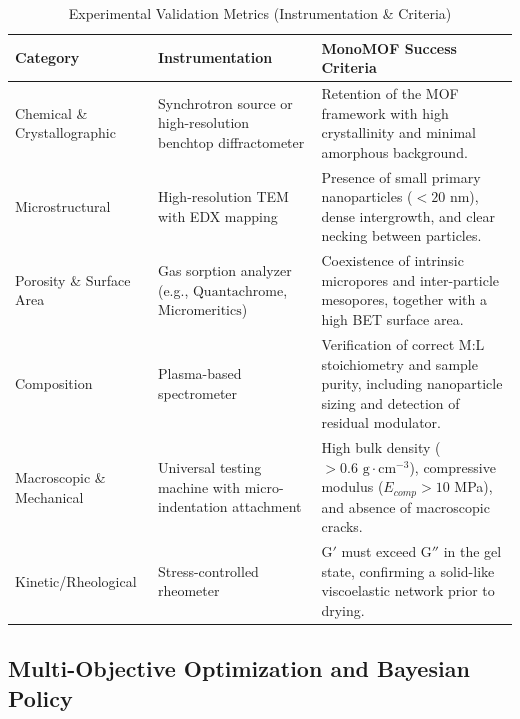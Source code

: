 \documentclass[12pt,a4paper]{article}
\begin{document}
\begin{table}[htbp]
  \centering
  \caption{Experimental Validation Metrics (Instrumentation \& Criteria)}
  \label{tab:table2-2}
  \begin{tabular}{p{3cm} p{4.2cm} p{8cm}}
    \toprule
    \textbf{Category} & \textbf{Instrumentation} & \textbf{MonoMOF Success Criteria} \\
    \midrule
    Chemical \& Crystallographic & 
    Synchrotron source or high-resolution benchtop diffractometer & 
    Retention of the MOF framework with high crystallinity 
    and minimal amorphous background. \\

    Microstructural & 
    High-resolution TEM with EDX mapping & 
    Presence of small primary nanoparticles ($<20$ nm), 
    dense intergrowth, and clear necking between particles. \\

    Porosity \& Surface Area & 
    Gas sorption analyzer (e.g., $\text{Quantachrome}$, $\text{Micromeritics}$) & 
    Coexistence of intrinsic micropores and inter-particle mesopores, 
    together with a high BET surface area. \\

    Composition & 
    Plasma-based spectrometer & 
    Verification of correct $\text{M}:\text{L}$ stoichiometry and sample purity, 
    including nanoparticle sizing\cite{ref36} 
    and detection of residual modulator. \\

    Macroscopic \& Mechanical & 
    Universal testing machine with micro-indentation attachment & 
    High bulk density ($>0.6 \text{ g} \cdot \text{cm}^{-3}$), 
    compressive modulus ($E_{comp} > 10$ MPa), 
    and absence of macroscopic cracks. \\

    Kinetic/Rheological & 
    Stress-controlled rheometer & 
    $\text{G}'$ must exceed $\text{G}''$ in the gel state, 
    confirming a solid-like viscoelastic network prior to drying. \\
    \bottomrule
  \end{tabular}
\end{table}


\subsection{Multi-Objective Optimization and Bayesian Policy}
\end{document}
